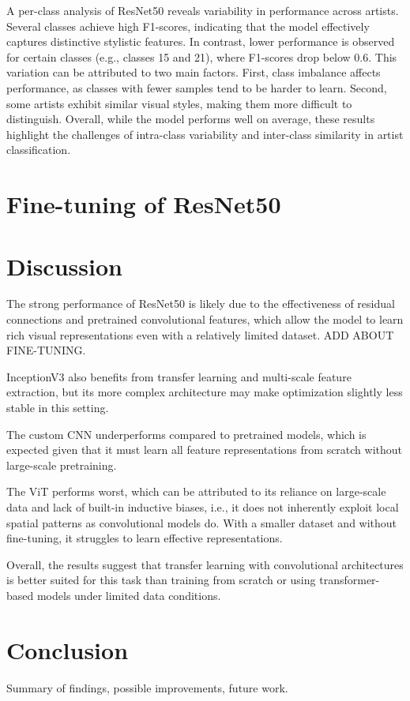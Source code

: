 \documentclass[12pt,a4paper]{article}
\begin{document}
A per-class analysis of ResNet50 reveals variability in performance across artists. 
Several classes achieve high F1-scores, indicating that the model effectively captures distinctive stylistic features. 
In contrast, lower performance is observed for certain classes (e.g., classes 15 and 21), where F1-scores drop below 0.6.
This variation can be attributed to two main factors. 
First, class imbalance affects performance, as classes with fewer samples tend to be harder to learn. 
Second, some artists exhibit similar visual styles, making them more difficult to distinguish. 
Overall, while the model performs well on average, these results highlight the challenges of intra-class variability and inter-class similarity in artist classification.

\section{Fine-tuning of ResNet50}

\section{Discussion}

The strong performance of ResNet50 is likely due to the effectiveness of residual connections and pretrained convolutional features, which allow the model to learn rich visual representations even with a relatively limited dataset. 
ADD ABOUT FINE-TUNING.

InceptionV3 also benefits from transfer learning and multi-scale feature extraction, but its more complex architecture may make optimization slightly less stable in this setting.

The custom CNN underperforms compared to pretrained models, which is expected given that it must learn all feature representations from scratch without large-scale pretraining. 

The ViT performs worst, which can be attributed to its reliance on large-scale data and lack of built-in inductive biases, i.e., it does not inherently exploit local spatial patterns as convolutional models do. 
With a smaller dataset and without fine-tuning, it struggles to learn effective representations.

Overall, the results suggest that transfer learning with convolutional architectures is better suited for this task than training from scratch or using transformer-based models under limited data conditions.

\section{Conclusion}
Summary of findings, possible improvements, future work.




\printbibliography
\end{document}
